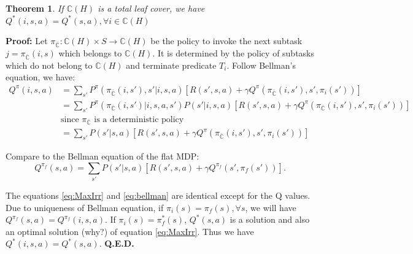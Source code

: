 \documentclass{article} %
\newtheorem{theorem}{Theorem}
\begin{document}

\begin{theorem}
    If $\mathbb{C}(H)$ is a total leaf cover, we have $Q^*(i, s, a) = Q^*(s, a), \forall i \in \mathbb{C}(H)$
\end{theorem}
\textbf{Proof:} Let $\pi_{\bar{\mathbb{C}}}: \mathbb{C}(H) \times S \rightarrow \mathbb{C}(H)$ be the policy to invoke
the next subtask $j = \pi_{\bar{\mathbb{C}}}(i, s)$ which belongs to $\mathbb{C}(H)$. It is determined
by the policy of subtasks which do not belong to $\mathbb{C}(H)$ and terminate predicate $T_i$. Follow Bellman's equation, we have:
\begin{align}
    Q^{\pi}(i, s, a) &= \sum_{s'} P^{\pi}(\pi_{\bar{\mathbb{C}}}(i, s'), s'|i, s, a) [R(s', s, a) + \gamma Q^{\pi}(\pi_{\bar{\mathbb{C}}}(i, s'), s', \pi_i(s'))]\\
    &=\sum_{s'}P^{\pi}(\pi_{\bar{\mathbb{C}}}(i, s')| i, s, a, s') P(s' | i, s, a)  [R(s', s, a) + \gamma Q^{\pi}(\pi_{\bar{\mathbb{C}}}(i, s'), s', \pi_i(s'))]\\
    &\mbox{since $\pi_{\bar{\mathbb{C}}}$ is a deterministic policy}\\
    &=\sum_{s'} P(s' | s, a) [R(s', s, a) + \gamma Q^{\pi}(\pi_{\bar{\mathbb{C}}}(i, s'), s', \pi_i(s'))]
    \label{eq:MaxIrr}
\end{align}

Compare to the Bellman equation of the flat MDP:
\begin{equation}
    Q^{\pi_f}(s, a) = \sum_{s'}P(s'|s, a)[R(s', s, a) + \gamma Q^{\pi_f}(s', \pi_f(s'))].
    \label{eq:bellman}
\end{equation}

The equations \ref{eq:MaxIrr} and \ref{eq:bellman} are identical except for the Q values.
Due to uniqueness of Bellman equation, if $\pi_i(s) = \pi_f(s), \forall s$, we will have $Q^{\pi_f}(s, a) = Q^{\pi_f}(i, s, a)$. 
If $\pi_i(s) = \pi^*_f(s)$, $Q^*(s, a)$ is a solution and also an optimal solution (why?) of equation \ref{eq:MaxIrr}.
Thus we have $Q^*(i, s, a) = Q^*(s, a)$. \textbf{Q.E.D.}
\end{document}
